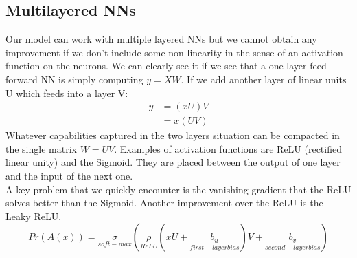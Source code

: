 \subsection{Multilayered NNs}
Our model can work with multiple layered NNs but we cannot obtain any improvement if we don't include some non-linearity in the sense of an activation function on the neurons. We can clearly see it if we see that a one layer feed-forward NN is simply computing $y = XW$. If we add another layer of linear units U which feeds into a layer V:
\begin{align*}
    y &= (xU)V\\
    &= x(UV)
\end{align*}
Whatever capabilities captured in the two layers situation can be compacted in the single matrix $W = UV$.
Examples of activation functions are ReLU (rectified linear unity) and the Sigmoid. They are placed between the output of one layer and the input of the next one.\\
A key problem that we quickly encounter is the vanishing gradient that the ReLU solves better than the Sigmoid. Another improvement over the ReLU is the Leaky ReLU.
\[ 
    Pr(A(x)) = \underset{soft-max}{\sigma} (\underset{ReLU}{\rho}(xU+\underset{first-layer bias}{b_u})V+\underset{second-layer bias}{b_v}) 
\]

